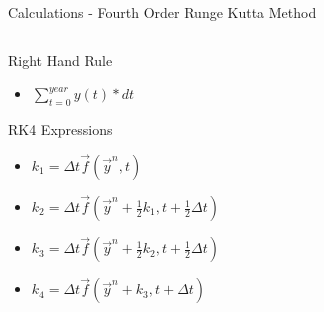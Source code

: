 \documentclass{beamer}	%
\begin{document}
\begin{frame}{Calculations - Fourth Order Runge Kutta Method}

\begin{columns} %

 \begin{column}{0.50\textwidth} %
  	\begin{block}{Right Hand Rule} 
   		 \begin{itemize}
     		 \item $\sum_{t=0}^{year}y(t)*dt$
   		 \end{itemize}
   	\end{block}
	
	\begin{block}{RK4 Expressions} %
    \begin{itemize}
      \item $k_{1}= \Delta t\vec{f}(\vec{y}^{n},t)$
      \item $k_{2}= \Delta t\vec{f}(\vec{y}^{n} + \frac{1}{2}k_{1},t + \frac{1}{2}\Delta t)$
      \item $k_{3}= \Delta t\vec{f}(\vec{y}^{n} + \frac{1}{2}k_{2},t + \frac{1}{2}\Delta t)$
      \item $k_{4}= \Delta t\vec{f}(\vec{y}^{n} + k_{3}, t + \Delta t)$
    \end{itemize}
  \end{block}
 \end{column}

 \begin{column}{0.50\textwidth} %


\end{column}
\end{columns}
\end{frame}
\end{document}
